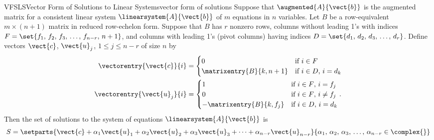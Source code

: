 \begin{theorem}{VFSLS}{Vector Form of Solutions to Linear Systems}{vector form of solutions}
Suppose that $\augmented{A}{\vect{b}}$ is the augmented matrix for a consistent linear system $\linearsystem{A}{\vect{b}}$ of $m$ equations in $n$ variables.
Let $B$ be a row-equivalent $m\times (n+1)$ matrix in reduced row-echelon form. Suppose that $B$ has $r$ nonzero rows,  columns without leading 1's with indices $F=\set{f_1,\,f_2,\,f_3,\,\ldots,\,f_{n-r},\,n+1}$, and columns with leading 1's (pivot columns) having indices $D=\set{d_1,\,d_2,\,d_3,\,\ldots,\,d_r}$.  Define vectors $\vect{c}$, $\vect{u}_j$, $1\leq j\leq n-r$ of size $n$ by
%
\begin{align*}
\vectorentry{\vect{c}}{i}&=
\begin{cases}
0&\text{if $i\in F$}\\
\matrixentry{B}{k,n+1}&\text{if $i\in D$, $i=d_k$}
\end{cases}\\
\vectorentry{\vect{u}_j}{i}&=
\begin{cases}
1&\text{if $i\in F$, $i=f_j$}\\
0&\text{if $i\in F$, $i\neq f_j$}\\
-\matrixentry{B}{k,f_j}&\text{if $i\in D$, $i=d_k$}
\end{cases}.
\end{align*}
%
Then the set of solutions to the system of equations $\linearsystem{A}{\vect{b}}$ is
%
\begin{equation*}
S=\setparts{
\vect{c}+\alpha_1\vect{u}_1+\alpha_2\vect{u}_2+\alpha_3\vect{u}_3+\cdots+\alpha_{n-r}\vect{u}_{n-r}
}{
\alpha_1,\,\alpha_2,\,\alpha_3,\,\ldots,\,\alpha_{n-r}\in\complex{\null}
}
\end{equation*}
%
\end{theorem}
%
